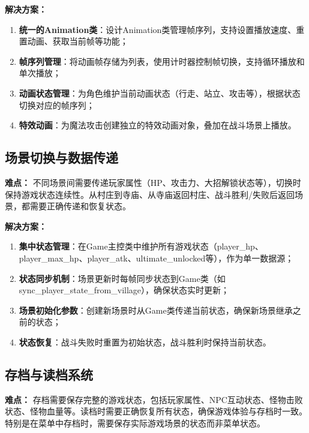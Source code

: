 \documentclass[a4paper,12pt]{article}
\begin{document}
\textbf{解决方案：}
\begin{enumerate}[label=(\arabic*)]
    \item \textbf{统一的Animation类}：设计Animation类管理帧序列，支持设置播放速度、重置动画、获取当前帧等功能；
    \item \textbf{帧序列管理}：将动画帧存储为列表，使用计时器控制帧切换，支持循环播放和单次播放；
    \item \textbf{动画状态管理}：为角色维护当前动画状态（行走、站立、攻击等），根据状态切换对应的帧序列；
    \item \textbf{特效动画}：为魔法攻击创建独立的特效动画对象，叠加在战斗场景上播放。
\end{enumerate}

\subsection{场景切换与数据传递}

\textbf{难点：}
不同场景间需要传递玩家属性（HP、攻击力、大招解锁状态等），切换时保持游戏状态连续性。从村庄到寺庙、从寺庙返回村庄、战斗胜利/失败后返回场景，都需要正确传递和恢复状态。

\textbf{解决方案：}
\begin{enumerate}[label=(\arabic*)]
    \item \textbf{集中状态管理}：在Game主控类中维护所有游戏状态（player\_hp、player\_max\_hp、player\_atk、ultimate\_unlocked等），作为单一数据源；
    \item \textbf{状态同步机制}：场景更新时每帧同步状态到Game类（如sync\_player\_state\_from\_village），确保状态实时更新；
    \item \textbf{场景初始化参数}：创建新场景时从Game类传递当前状态，确保新场景继承之前的状态；
    \item \textbf{状态恢复}：战斗失败时重置为初始状态，战斗胜利时保持当前状态。
\end{enumerate}

\subsection{存档与读档系统}

\textbf{难点：}
存档需要保存完整的游戏状态，包括玩家属性、NPC互动状态、怪物击败状态、怪物血量等。读档时需要正确恢复所有状态，确保游戏体验与存档时一致。特别是在菜单中存档时，需要保存实际游戏场景的状态而非菜单状态。
\end{document}
